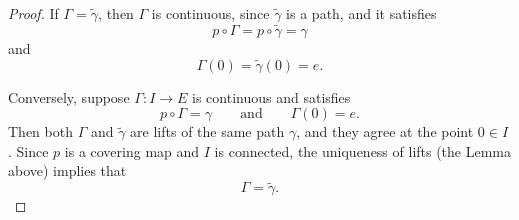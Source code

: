 \documentclass{article}
\begin{document}
\begin{proof}
If \(\Gamma=\widetilde{\gamma}\), then \(\Gamma\) is continuous, since \(\widetilde{\gamma}\) is a path, and it satisfies
\[
p\circ \Gamma = p\circ \widetilde{\gamma}=\gamma
\]
and
\[
\Gamma(0)=\widetilde{\gamma}(0)=e.
\]

Conversely, suppose \(\Gamma:I\to E\) is continuous and satisfies
\[
p\circ \Gamma=\gamma
\qquad\text{and}\qquad
\Gamma(0)=e.
\]
Then both \(\Gamma\) and \(\widetilde{\gamma}\) are lifts of the same path \(\gamma\), and they agree at the point \(0\in I\). Since \(p\) is a covering map and \(I\) is connected, the uniqueness of lifts (the Lemma above) implies that
\[
\Gamma=\widetilde{\gamma}.
\]
\end{proof}
\end{document}
